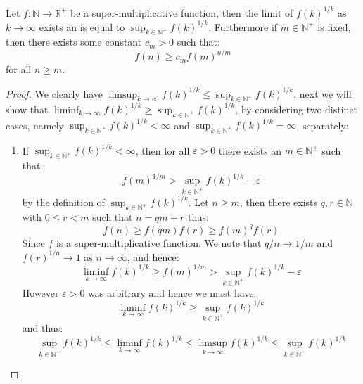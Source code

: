\begin{lemma}\label{lem:limit_of_super_multiplicative}
	Let $f: \mathbb{N} \to \mathbb{R}^{+}$ be a super-multiplicative function, then the limit of $f(k)^{1 / k}$ as $k \to \infty$ exists an is equal to $\sup_{k \in \mathbb{N}^{+}} f(k)^{1 / k}$. Furthermore if $m \in \mathbb{N}^{+}$ is fixed, then there exists some constant $c_m > 0$ such that:
	\begin{equation*}
		f(n) \geq c_{m} f(m)^{n / m}
	\end{equation*}
	for all $n \geq m$.
\end{lemma}
\begin{proof}
	We clearly have $\limsup_{k \to \infty} f(k)^{1/k} \leq \sup_{k \in \mathbb{N}^{+}} f(k)^{1/k}$, next we will show that $\liminf_{k \to \infty} f(k)^{1 / k} \geq \sup_{k \in \mathbb{N}^{+}} f(k)^{1/k}$, by considering two distinct cases, namely $\sup_{k \in \mathbb{N}^{+}} f(k)^{1/k} < \infty$ and $\sup_{k \in \mathbb{N}^{+}} f(k)^{1/k} = \infty$, separately:
	\begin{enumerate}
		\item If $\sup_{k \in \mathbb{N}^{+}} f(k)^{1/k} < \infty$, then for all $\varepsilon > 0$ there exists an $m \in \mathbb{N}^{+}$ such that:
		      \begin{equation*}
			      f(m)^{1/m} > \sup_{k \in \mathbb{N}^{+}} f(k)^{1/k} - \varepsilon
		      \end{equation*}
		      by the definition of $\sup_{k \in \mathbb{N}^+} f(k)^{1/k}$. Let $n \geq m$, then there exists $q, r \in \mathbb{N}$ with $0 \leq r < m$ such that $n = qm + r$ thus:
		      \begin{equation*}
			      f(n) \geq f(qm) f(r) \geq f(m)^q f(r)
		      \end{equation*}
		      Since $f$ is a super-multiplicative function. We note that $q / n \to 1 / m$ and $f(r)^{1/n} \to 1$ as $n \to \infty$, and hence:
		      \begin{equation*}
			      \liminf_{k \to \infty} f(k)^{1/k} \geq f(m)^{1/m} > \sup_{k \in \mathbb{N}^{+}} f(k)^{1/k} - \varepsilon
		      \end{equation*}
		      However $\varepsilon > 0$ was arbitrary and hence we must have:
		      \begin{equation*}
			      \liminf_{k \to \infty} f(k)^{1/k} \geq \sup_{k \in \mathbb{N}^{+}} f(k)^{1/k}
		      \end{equation*}
		      and thus:
		      \begin{equation*}
			      \sup_{k \in \mathbb{N}^{+}} f(k)^{1/k} \leq \liminf_{k \to \infty} f(k)^{1/k} \leq \limsup_{k \to \infty} f(k)^{1/k} \leq \sup_{k \in \mathbb{N}^{+}} f(k)^{1/k}

\end{equation*}
\end{enumerate}
\end{proof}
